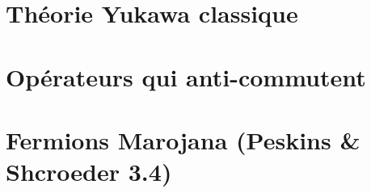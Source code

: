 \documentclass{article}
\numberwithin{equation}{section}
\theoremstyle{solution}
\begin{document}
\section{Théorie Yukawa classique}

\section{Opérateurs qui anti-commutent}

\section{Fermions Marojana (Peskins \& Shcroeder 3.4)}
\end{document}
